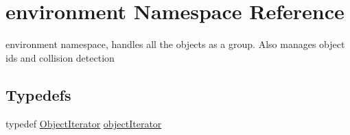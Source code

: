 \hypertarget{namespaceenvironment}{\section{environment Namespace Reference}
\label{namespaceenvironment}
}


environment namespace, handles all the objects as a group. Also manages object ids and collision detection  


\subsection*{Typedefs}
\begin{DoxyCompactItemize}
\item 
typedef \hyperlink{classObjectIterator}{Object\-Iterator} \hyperlink{namespaceenvironment_a3a7a388d4b4ceb0a34bf0c72579780e1}{object\-Iterator}
\end{DoxyCompactItemize}
